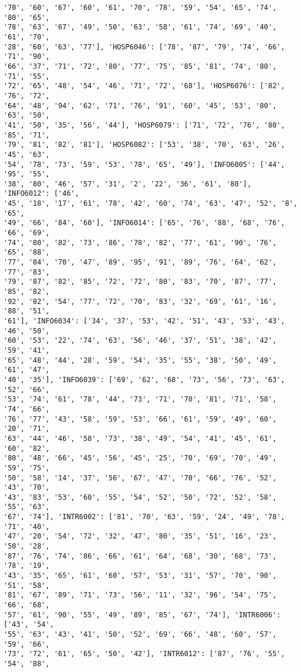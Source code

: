 \documentclass[11pt]{article}
\begin{document}
\begin{Verbatim}[commandchars=\\\{\}]
'70', '60', '67', '60', '61', '70', '78', '59', '54', '65', '74', '80', '65',
'78', '63', '67', '49', '50', '63', '58', '61', '74', '69', '40', '61', '70',
'28', '60', '63', '77'], 'HOSP6046': ['78', '87', '79', '74', '66', '71', '90',
'66', '37', '71', '72', '80', '77', '75', '85', '81', '74', '80', '71', '55',
'72', '65', '48', '54', '46', '71', '72', '68'], 'HOSP6076': ['82', '76', '72',
'64', '48', '94', '62', '71', '76', '91', '60', '45', '53', '80', '63', '50',
'41', '50', '35', '56', '44'], 'HOSP6079': ['71', '72', '76', '80', '85', '71',
'79', '81', '82', '81'], 'HOSP6082': ['53', '38', '70', '63', '26', '45', '63',
'54', '78', '73', '59', '53', '78', '65', '49'], 'INFO6005': ['44', '95', '55',
'38', '80', '46', '57', '31', '2', '22', '36', '61', '80'], 'INFO6012': ['46',
'45', '18', '17', '61', '78', '42', '60', '74', '63', '47', '52', '8', '65',
'49', '66', '84', '60'], 'INFO6014': ['65', '76', '88', '68', '76', '66', '69',
'74', '80', '82', '73', '86', '78', '82', '77', '61', '90', '76', '65', '88',
'77', '84', '70', '47', '89', '95', '91', '89', '76', '64', '62', '77', '83',
'79', '87', '82', '85', '72', '72', '80', '83', '70', '87', '77', '85', '82',
'92', '82', '54', '77', '72', '70', '83', '32', '69', '61', '16', '88', '51',
'61'], 'INFO6034': ['34', '37', '53', '42', '51', '43', '53', '43', '46', '50',
'60', '53', '22', '74', '63', '56', '46', '37', '51', '38', '42', '59', '41',
'65', '48', '44', '28', '59', '54', '35', '55', '38', '50', '49', '61', '47',
'40', '35'], 'INFO6039': ['69', '62', '68', '73', '56', '73', '63', '52', '66',
'53', '74', '61', '78', '44', '73', '71', '70', '81', '71', '58', '74', '66',
'76', '77', '43', '58', '59', '53', '66', '61', '59', '49', '60', '20', '71',
'63', '44', '46', '58', '73', '38', '49', '54', '41', '45', '61', '60', '82',
'80', '48', '66', '45', '56', '45', '25', '70', '69', '70', '49', '59', '75',
'50', '58', '14', '37', '56', '67', '47', '70', '66', '76', '52', '43', '70',
'43', '83', '53', '60', '55', '54', '52', '50', '72', '52', '58', '55', '63',
'67', '74'], 'INTR6002': ['81', '70', '63', '59', '24', '49', '78', '71', '40',
'47', '20', '54', '72', '32', '47', '80', '35', '51', '16', '23', '50', '28',
'87', '76', '74', '86', '66', '61', '64', '68', '30', '68', '73', '78', '19',
'43', '35', '65', '61', '60', '57', '53', '31', '57', '70', '90', '51', '58',
'81', '67', '89', '71', '73', '56', '11', '32', '96', '54', '75', '66', '68',
'57', '61', '90', '55', '49', '89', '85', '67', '74'], 'INTR6006': ['43', '54',
'55', '63', '43', '41', '50', '52', '69', '66', '48', '60', '57', '59', '66',
'73', '72', '61', '65', '50', '42'], 'INTR6012': ['87', '76', '55', '54', '88',

\end{Verbatim}
\end{document}
